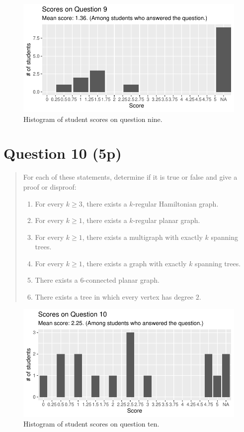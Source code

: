 \documentclass[nobib]{tufte-handout}
\begin{document}
\begin{figure}
  \centering
  \includegraphics[width = \textwidth]{Q9.pdf}
  \caption[Score histogram for Q9]{Histogram of student scores on question nine.}
  \label{fig:Q9}
\end{figure}

\section{Question 10 (5p)} %

\begin{quotation}
  For each of these statements, determine if it is true or false and give a proof or disproof:
  \begin{enumerate}[label=\alph*)]
    \item For every $k\geq 3$, there exists a $k$-regular Hamiltonian graph.
    \item For every $k \geq 1$, there exists a $k$-regular planar graph.
    \item For every $k \geq 1$, there exists a multigraph with exactly $k$ spanning trees.
    \item For every $k \geq 1$, there exists a graph with exactly $k$ spanning trees.
    \item There exists a $6$-connected planar graph.
    \item There exists a tree in which every vertex has degree $2$.
  \end{enumerate}
\end{quotation}

\begin{figure}
  \centering
  \includegraphics[width = \textwidth]{Q10.pdf}
  \caption[Score histogram for Q10]{Histogram of student scores on question ten.}
  \label{fig:Q10}
\end{figure}
\end{document}
